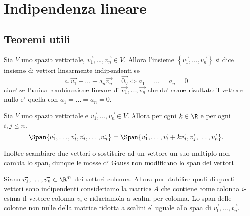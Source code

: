 \chapter{Indipendenza lineare}

\section{Teoremi utili}

\begin{definition}
    Sia $V$ uno spazio vettoriale, $\vec{v_1}, \dots, \vec{v_n} \in V$. Allora l'insieme $\left\{ \vec{v_1}, \dots, \vec{v_n} \right\}$ si dice insieme di vettori linearmente indipendenti se
    \begin{equation}
        a_1\vec{v_1} + \dots + a_n\vec{v_n} = \vec{0_V} \iff a_1 = \dots = a_n = 0
    \end{equation}
    cioe' se l'unica combinazione lineare di $\vec{v_1}, \dots, \vec{v_n}$ che da' come risultato il vettore nullo e' quella con $a_1 = \dots = a_n = 0$.
\end{definition}

\begin{proposition} \label{span_Gauss}

    Sia $V$ uno spazio vettoriale e $\vec{v_1}, \dots, \vec{v_n} \in V$. Allora per ogni $k \in \R$ e per ogni $i, j \leq n$.
    \begin{equation}
        \Span{\vec{v_1}, \dots, \vec{v_i}, \vec{v_j}, \dots, \vec{v_n}} = \Span{\vec{v_1}, \dots, \vec{v_i} + k\vec{v_j}, \vec{v_j}, \dots, \vec{v_n}}.
    \end{equation}
    
    Inoltre scambiare due vettori o sostituire ad un vettore un suo multiplo non cambia lo span, dunque le mosse di Gauss non modificano lo span dei vettori.
\end{proposition}

\begin{proposition} \label{span_colonne_indipendenti}

    Siano $\vec{v_1}, \dots, \vec{v_n} \in \R^m$ dei vettori colonna. Allora per stabilire quali di questi vettori sono indipendenti consideriamo la matrice $A$ che contiene come colonna $i$-esima il vettore colonna $v_i$ e riduciamola a scalini per colonna. Lo span delle colonne non nulle della matrice ridotta a scalini e' uguale allo span di $\vec{v_1}, \dots, \vec{v_n}$.
\end{proposition}